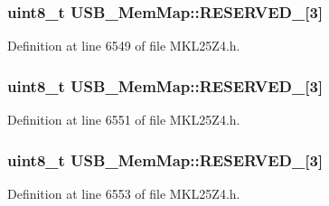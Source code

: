 \subsubsection[{\texorpdfstring{R\+E\+S\+E\+R\+V\+E\+D\+\_\+22}{RESERVED_22}}]{\setlength{\rightskip}{0pt plus 5cm}uint8\+\_\+t U\+S\+B\+\_\+\+Mem\+Map\+::\+R\+E\+S\+E\+R\+V\+E\+D\+\_\mbox{[}3\mbox{]}}\hypertarget{struct_u_s_b___mem_map_afe66a08c7da472a7374ac05a5d0fd712}{}\label{struct_u_s_b___mem_map_afe66a08c7da472a7374ac05a5d0fd712}


Definition at line 6549 of file M\+K\+L25\+Z4.\+h.

\subsubsection[{\texorpdfstring{R\+E\+S\+E\+R\+V\+E\+D\+\_\+23}{RESERVED_23}}]{\setlength{\rightskip}{0pt plus 5cm}uint8\+\_\+t U\+S\+B\+\_\+\+Mem\+Map\+::\+R\+E\+S\+E\+R\+V\+E\+D\+\_\mbox{[}3\mbox{]}}\hypertarget{struct_u_s_b___mem_map_ab40fcbbe084ce769cd4c160da7823f8c}{}\label{struct_u_s_b___mem_map_ab40fcbbe084ce769cd4c160da7823f8c}


Definition at line 6551 of file M\+K\+L25\+Z4.\+h.

\subsubsection[{\texorpdfstring{R\+E\+S\+E\+R\+V\+E\+D\+\_\+24}{RESERVED_24}}]{\setlength{\rightskip}{0pt plus 5cm}uint8\+\_\+t U\+S\+B\+\_\+\+Mem\+Map\+::\+R\+E\+S\+E\+R\+V\+E\+D\+\_\mbox{[}3\mbox{]}}\hypertarget{struct_u_s_b___mem_map_a6f64544a4aa0f7b68d02d2df9c3cb47c}{}\label{struct_u_s_b___mem_map_a6f64544a4aa0f7b68d02d2df9c3cb47c}


Definition at line 6553 of file M\+K\+L25\+Z4.\+h.

